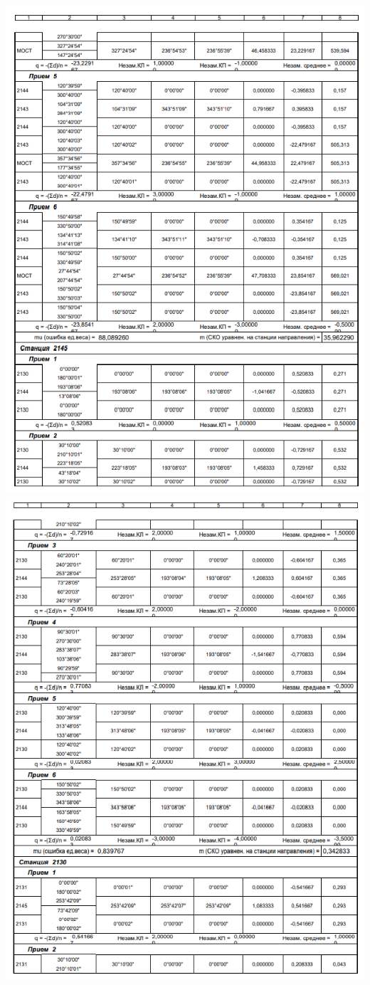 \documentclass[a4paper]{article}
\begin{document}
\begin{newpage}
\begin{center}
        \includegraphics[scale=1.4]{vedomosty/скп3.png}
        \includegraphics[scale=1.4]{vedomosty/скп4.png}

\end{center}
\end{newpage}
\end{document}
